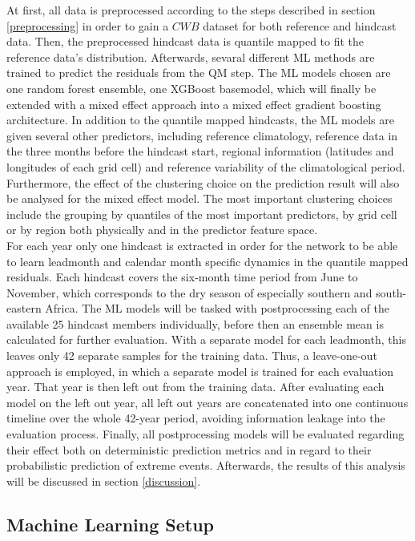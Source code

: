 \documentclass[ba-lentz.tex]{subfile}
\begin{document}
At first, all data is preprocessed according to the steps described in section \ref{preprocessing} in order to gain a $CWB$ dataset for both reference and hindcast data.
Then, the preprocessed hindcast data is quantile mapped to fit the reference data's distribution.
Afterwards, sevaral different ML methods are trained to predict the residuals from the QM step.
The ML models chosen are one random forest ensemble, one XGBoost basemodel, which will finally be extended with a mixed effect approach into a mixed effect gradient boosting architecture.
In addition to the quantile mapped hindcasts, the ML models are given several other predictors, including reference climatology, reference data in the three months before the hindcast start, regional information (latitudes and longitudes of each grid cell) and reference variability of the climatological period.
Furthermore, the effect of the clustering choice on the prediction result will also be analysed for the mixed effect model.
The most important clustering choices include the grouping by quantiles of the most important predictors, by grid cell or by region both physically and in the predictor feature space. \\
For each year only one hindcast is extracted in order for the network to be able to learn leadmonth and calendar month specific dynamics in the quantile mapped residuals.
Each hindcast covers the six-month time period from June to November, which corresponds to the dry season of especially southern and south-eastern Africa.
The ML models will be tasked with postprocessing each of the available 25 hindcast members individually, before then an ensemble mean is calculated for further evaluation.
With a separate model for each leadmonth, this leaves only 42 separate samples for the training data.
Thus, a leave-one-out approach is employed, in which a separate model is trained for each evaluation year.
That year is then left out from the training data.
After evaluating each model on the left out year, all left out years are concatenated into one continuous timeline over the whole 42-year period, avoiding information leakage into the evaluation process.
Finally, all postprocessing models will be evaluated regarding their effect both on deterministic prediction metrics and in regard to their probabilistic prediction of extreme events.
Afterwards, the results of this analysis will be discussed in section \ref{discussion}.

\subsection{Machine Learning Setup}
\end{document}
